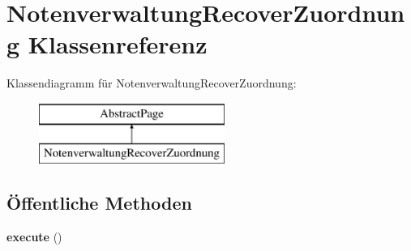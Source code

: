 \hypertarget{class_notenverwaltung_recover_zuordnung}{}\section{Notenverwaltung\+Recover\+Zuordnung Klassenreferenz}
\label{class_notenverwaltung_recover_zuordnung}
Klassendiagramm für Notenverwaltung\+Recover\+Zuordnung\+:\begin{figure}[H]
\begin{center}
\leavevmode
\includegraphics[height=2.000000cm]{class_notenverwaltung_recover_zuordnung}
\end{center}
\end{figure}
\subsection*{Öffentliche Methoden}
\begin{DoxyCompactItemize}
\item 
\mbox{\label{class_notenverwaltung_recover_zuordnung_a50ad50e708ebdbcb90c31cb4aece43d9}} 
{\bfseries execute} ()
\end{DoxyCompactItemize}
